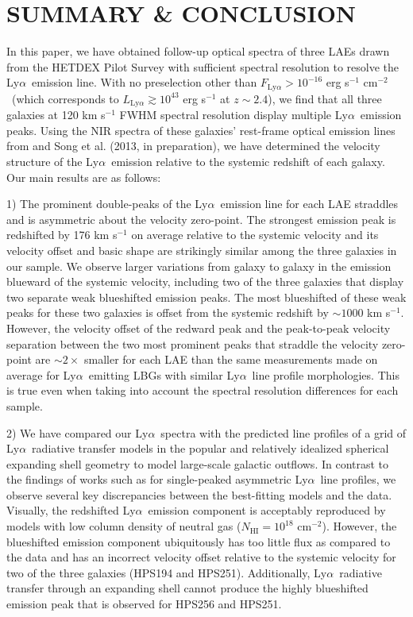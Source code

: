 \documentclass{emulateapj}
\newcommand{\lya}{Ly$\alpha$}
\newcommand{\fluxcgs}{erg s$^{-1}$ cm$^{-2}$}
\begin{document}
\section{SUMMARY \& CONCLUSION}\label{sec:Conclusions}
In this paper, we have obtained follow-up optical spectra of three LAEs drawn from the HETDEX Pilot Survey \citep{adams2011} with sufficient spectral resolution to resolve the \lya\ emission line. With no preselection other than $F_{\mathrm{Ly}\alpha} > 10^{-16}$ \fluxcgs\ (which corresponds to $L_{\mathrm{Ly}\alpha} \gtrsim 10^{43}$ erg s$^{-1}$ at $z\sim2.4$), we find that all three galaxies at 120 km s$^{-1}$ FWHM spectral resolution display multiple \lya\ emission peaks. Using the NIR spectra of these galaxies' rest-frame optical emission lines from \citet{finkelstein2011} and Song et al. (2013, in preparation), we have determined the velocity structure of the \lya\ emission relative to the systemic redshift of each galaxy. Our main results are as follows:

1) The prominent double-peaks of the \lya\ emission line for each LAE straddles and is asymmetric about the velocity zero-point. The strongest emission peak is redshifted by 176 km s$^{-1}$ on average relative to the systemic velocity and its velocity offset and basic shape are strikingly similar among the three galaxies in our sample. We observe larger variations from galaxy to galaxy in the emission blueward of the systemic velocity, including two of the three galaxies that display two separate weak blueshifted emission peaks. The most blueshifted of these weak peaks for these two galaxies is offset from the systemic redshift by $\sim1000$ km s$^{-1}$. However, the velocity offset of the redward peak and the peak-to-peak velocity separation between the two most prominent peaks that straddle the velocity zero-point are $\sim2\times$ smaller for each LAE than the same measurements made on average for \lya\ emitting LBGs with similar \lya\ line profile morphologies. This is true even when taking into account the spectral resolution differences for each sample. 

2) We have compared our \lya\ spectra with the predicted line profiles of a grid of \lya\ radiative transfer models in the popular and relatively idealized spherical expanding shell geometry to model large-scale galactic outflows. In contrast to the findings of works such as \citet{verhamme2008} for single-peaked asymmetric \lya\ line profiles, we observe several key discrepancies between the best-fitting models and the data. Visually, the redshifted \lya\ emission component is acceptably reproduced by models with low column density of neutral gas ($N_{\mathrm{HI}} = 10^{18}$ cm$^{-2}$). However, the blueshifted emission component ubiquitously has too little flux as compared to the data and has an incorrect velocity offset relative to the systemic velocity for two of the three galaxies (HPS194 and HPS251). Additionally, \lya\ radiative transfer through an expanding shell cannot produce the highly blueshifted emission peak that is observed for HPS256 and HPS251.  
\end{document}
